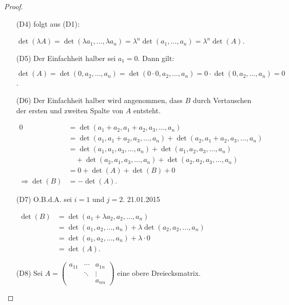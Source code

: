 \begin{proof}\
	\begin{itemize}
		\item[\normalfont(D4)]
			folgt aus (D1):
			
			$ \det(\lambda A) = \det(\lambda a_1, \ldots, \lambda a_n) = \lambda^n \det(a_1, \ldots, a_n) = \lambda^n \det(A) $.
		\item[\normalfont(D5)]
			Der Einfachheit halber sei $ a_1 = 0 $. Dann gilt:
			
			$ \det(A) = \det(0, a_2, \ldots, a_n) = \det(0 \cdot 0, a_2, \ldots, a_n) = 0 \cdot \det(0, a_2, \ldots, a_n) = 0 $.
		\item[\normalfont(D6)]
			Der Einfachheit halber wird angenommen, dass $ B $ durch Vertauschen der ersten und zweiten Spalte von $ A $ entsteht.
			
			$ \begin{aligned}
				0 &= \det(a_1 + a_2, a_1 + a_2, a_3, \ldots, a_n) \\
				&= \det(a_1, a_1 + a_2, a_3, \ldots, a_n) + \det(a_2, a_1 + a_2, a_3, \ldots, a_n) \\
				&= \det(a_1, a_1, a_3, \ldots, a_n) + \det(a_1, a_2, a_3, \ldots, a_n) \\
				&\quad + \det(a_2, a_1, a_3, \ldots, a_n) + \det(a_2, a_2, a_3, \ldots, a_n) \\
				&= 0 + \det(A) + \det(B) + 0 \\
				\Rightarrow \det(B) &= -\det(A). 
			\end{aligned} $
		\item[\normalfont(D7)]
			O.B.d.A. sei $ i=1 $ und $ j=2 $. \hfill 21.01.2015
			
			$ \begin{aligned}
				\det(B) &= \det(a_1 + \lambda a_2, a_2, \ldots, a_n) \\
				&= \det(a_1, a_2, \ldots, a_n) + \lambda\det(a_2, a_2, \ldots, a_n) \\
				&= \det(a_1, a_2, \ldots, a_n) + \lambda \cdot 0 \\
				&= \det(A).
			\end{aligned} $
		\item[\normalfont(D8)]
			Sei $ A =
			\begin{pmatrix}
				a_{11} & \cdots & a_{1n} \\
				& \ddots & \vdots \\
				& & a_{nn}
			\end{pmatrix} $ eine obere Dreiecksmatrix.
			

\end{itemize}
\end{proof}
